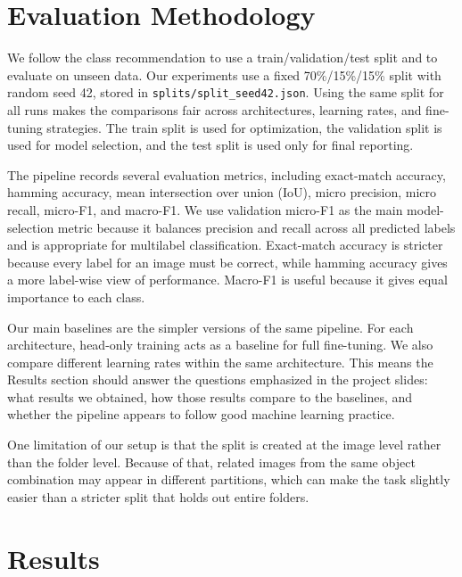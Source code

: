 \documentclass[10pt]{article}
\begin{document}
\section{Evaluation Methodology}

We follow the class recommendation to use a train/validation/test split and to
evaluate on unseen data. Our experiments use a fixed 70\%/15\%/15\% split with
random seed 42, stored in \texttt{splits/split\_seed42.json}. Using the same
split for all runs makes the comparisons fair across architectures, learning
rates, and fine-tuning strategies. The train split is used for optimization,
the validation split is used for model selection, and the test split is used
only for final reporting.

The pipeline records several evaluation metrics, including exact-match
accuracy, hamming accuracy, mean intersection over union (IoU), micro
precision, micro recall, micro-F1, and macro-F1. We use validation micro-F1 as
the main model-selection metric because it balances precision and recall across
all predicted labels and is appropriate for multilabel classification.
Exact-match accuracy is stricter because every label for an image must be
correct, while hamming accuracy gives a more label-wise view of performance.
Macro-F1 is useful because it gives equal importance to each class.

Our main baselines are the simpler versions of the same pipeline. For each
architecture, head-only training acts as a baseline for full fine-tuning. We
also compare different learning rates within the same architecture. This means
the Results section should answer the questions emphasized in the project
slides: what results we obtained, how those results compare to the baselines,
and whether the pipeline appears to follow good machine learning practice.

One limitation of our setup is that the split is created at the image level
rather than the folder level. Because of that, related images from the same
object combination may appear in different partitions, which can make the task
slightly easier than a stricter split that holds out entire folders.




\section{Results}
\end{document}
